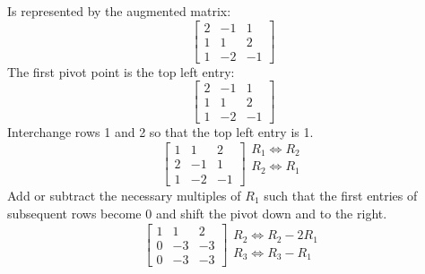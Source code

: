 \documentclass{tufte-book}
\begin{document}
Is represented by the augmented matrix:
\begin{equation*}
	\left[
		\begin{array}{cc|c}
			2 & -1 & 1  \\
			1 & 1  & 2  \\
			1 & -2 & -1
		\end{array}
		\right]
\end{equation*}
The first pivot point is the top left entry:
\begin{equation*}
	\left[
		\begin{array}{cc|c}
			\boxed{2} & -1 & 1  \\
			1         & 1  & 2  \\
			1         & -2 & -1
		\end{array}
		\right]
\end{equation*}
Interchange rows 1 and 2 so that the top left entry is 1.
\begin{equation*}
	\left[
		\begin{array}{cc|c}
			\boxed{1} & 1  & 2  \\
			2         & -1 & 1  \\
			1         & -2 & -1
		\end{array}
		\right]
	\begin{array}{l}
		R_1 \iff R_2 \\
		R_2 \iff R_1 \\
		\\
	\end{array}
\end{equation*}
Add or subtract the necessary multiples of $R_1$ such that the first entries of subsequent rows become 0 and shift
the pivot down and to the right.
\begin{equation*}
	\left[
		\begin{array}{cc|c}
			1 & 1          & 2  \\
			0 & \boxed{-3} & -3 \\
			0 & -3         & -3
		\end{array}
		\right]
	\begin{array}{l}
		\\
		R_2 \iff R_2 - 2R_1 \\
		R_3 \iff R_3 - R_1  \\
	\end{array}
\end{equation*}
\end{document}
